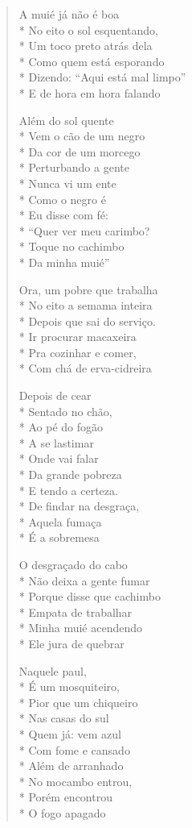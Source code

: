 \begin{verse}
A muié já não é boa\\*
No eito o sol esquentando,\\*
Um toco preto atrás dela\\*
Como quem está esporando\\*
Dizendo: ``Aqui está mal limpo''\\*
E de hora em hora falando

Além do sol quente\\*
Vem o cão de um negro\\*
Da cor de um morcego\\*
Perturbando a gente\\*
Nunca vi um ente\\*
Como o negro é\\*
Eu disse com fé:\\*
``Quer ver meu carimbo?\\*
Toque no cachimbo\\*
Da minha muié''

Ora, um pobre que trabalha\\*
No eito a semama inteira\\*
Depois que sai do serviço.\\*
Ir procurar macaxeira\\*
Pra cozinhar e comer,\\*
Com chá de erva-cidreira

Depois de cear\\*
Sentado no chão,\\*
Ao pé do fogão\\*
A se lastimar\\*
Onde vai falar\\*
Da grande pobreza\\*
E tendo a certeza.\\*
De findar na desgraça,\\*
Aquela fumaça\\*
É a sobremesa

O desgraçado do cabo\\*
Não deixa a gente fumar\\*
Porque disse que cachimbo\\*
Empata de trabalhar\\*
Minha muié acendendo\\*
Ele jura de quebrar

Naquele paul,\\*
É um mosquiteiro,\\*
Pior que um chiqueiro\\*
Nas casas do sul\\*
Quem já: vem azul\\*
Com fome e cansado\\*
Além de arranhado\\*
No mocambo entrou,\\*
Porém encontrou\\*
O fogo apagado


\end{verse}
